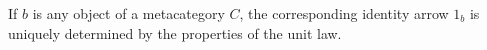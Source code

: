 If $b$ is any object of a metacategory $C$, the corresponding identity arrow $1_b$ is uniquely determined by the properties of the unit law.
